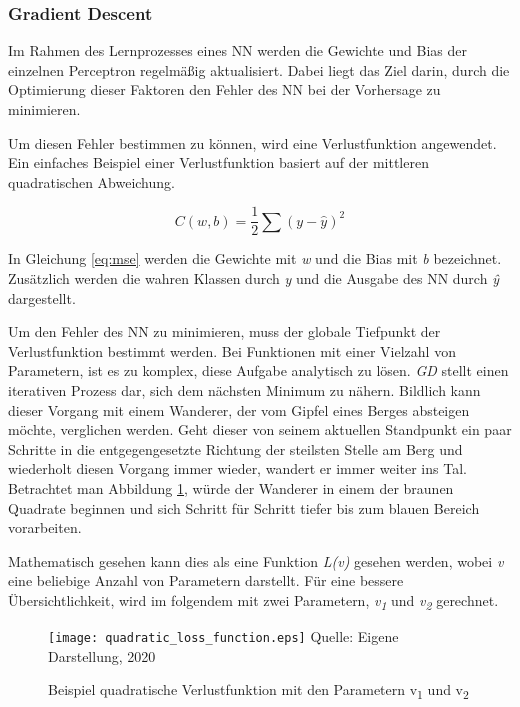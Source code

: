 \subsubsection{Gradient Descent}
Im Rahmen des Lernprozesses eines \ac{NN} werden die Gewichte und Bias der einzelnen Perceptron regelmäßig aktualisiert. Dabei liegt das Ziel darin, durch die Optimierung dieser Faktoren den Fehler des \ac{NN} bei der Vorhersage zu minimieren.

Um diesen Fehler bestimmen zu können, wird eine Verlustfunktion angewendet. Ein einfaches Beispiel einer Verlustfunktion basiert auf der mittleren quadratischen Abweichung.

\begin{equation} \label{eq:mse}
    C(w,b) = \frac{1}{2} \sum (y-\hat{y})^2
\end{equation}

In Gleichung \ref{eq:mse} werden die Gewichte mit \textit{w} und die Bias mit \textit{b} bezeichnet. Zusätzlich werden die wahren Klassen durch \textit{y} und die Ausgabe des \ac{NN} durch \textit{\^{y}} dargestellt. 


Um den Fehler des \ac{NN} zu minimieren, muss der globale Tiefpunkt der Verlustfunktion bestimmt werden. Bei Funktionen mit einer Vielzahl von Parametern, ist es zu komplex, diese Aufgabe analytisch zu lösen. \textit{\ac{GD}} stellt einen iterativen Prozess dar, sich dem nächsten Minimum zu nähern. Bildlich kann dieser Vorgang mit einem Wanderer, der vom Gipfel eines Berges absteigen möchte, verglichen werden. Geht dieser von seinem aktuellen Standpunkt ein paar Schritte in die entgegengesetzte Richtung der steilsten Stelle am Berg und wiederholt diesen Vorgang immer wieder, wandert er immer weiter ins Tal. Betrachtet man Abbildung \ref{fig:quadLoss}, würde der Wanderer in einem der braunen Quadrate beginnen und sich Schritt für Schritt tiefer bis zum blauen Bereich vorarbeiten. 

Mathematisch gesehen kann dies als eine Funktion \textit{L(v)} gesehen werden, wobei \textit{v} eine beliebige Anzahl von Parametern darstellt. Für eine bessere Übersichtlichkeit, wird im folgendem mit zwei Parametern, \textit{v\textsubscript{1}} und \textit{v\textsubscript{2}} gerechnet.

\begin{figure}[t]
    \centering
    \caption[]{Beispiel quadratische Verlustfunktion mit den Parametern v\textsubscript{1} und v\textsubscript{2}}
	\label{fig:quadLoss}
    \texttt{[image: quadratic\_loss\_function.eps]}
    Quelle: Eigene Darstellung, 2020
\end{figure}

